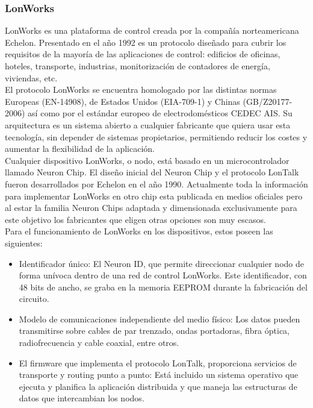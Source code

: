 \subsubsection{LonWorks}
LonWorks es una plataforma de control creada por la compañía norteamericana Echelon\cite{serconint}. Presentado en el año 1992 es un protocolo diseñado para cubrir los requisitos de la mayoría de las aplicaciones de control: edificios de oficinas, hoteles, transporte, industrias, monitorización de contadores de energía, viviendas, etc.\\

El protocolo LonWorks se encuentra homologado por las distintas normas Europeas (EN-14908), de Estados Unidos (EIA-709-1) y Chinas (GB/Z20177-2006) así como por el estándar europeo de electrodomésticos CEDEC AIS. Su arquitectura es un sistema abierto a cualquier fabricante que quiera usar esta tecnología, sin depender de sistemas propietarios, permitiendo reducir los costes y aumentar la flexibilidad de la aplicación.\\

Cualquier dispositivo LonWorks, o nodo, está basado en un microcontrolador llamado Neuron Chip. El diseño inicial del Neuron Chip y el protocolo LonTalk fueron desarrollados por Echelon en el año 1990. Actualmente toda la información para implementar LonWorks en otro chip esta publicada en medios oficiales pero al estar la familia Neuron Chips adaptada y dimensionada exclusivamente para este objetivo los fabricantes que eligen otras opciones son muy escasos.\\

Para el funcionamiento de LonWorks en los dispositivos, estos poseen las siguientes:
\begin{itemize}
\item Identificador único: El Neuron ID, que permite direccionar cualquier nodo de forma unívoca dentro de una red de control LonWorks. Este identificador, con 48 bits de ancho, se graba en la memoria EEPROM durante la fabricación del circuito.
\item Modelo de comunicaciones independiente del medio físico: Los datos pueden transmitirse sobre cables de par trenzado, ondas portadoras, fibra óptica, radiofrecuencia y cable coaxial, entre otros.
\item El firmware que implementa el protocolo LonTalk, proporciona servicios de transporte y routing punto a punto: Está incluido un sistema operativo que ejecuta y planifica la aplicación distribuida y que maneja las estructuras de datos que intercambian los nodos.
\end{itemize}

